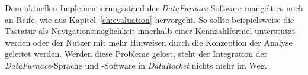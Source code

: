 \documentclass[
  language=german, %
  type=bachelor,%
  ngerman
]{isthesis}
\begin{document}
\begin{content}
Dem aktuellen Implementierungsstand der \textit{DataFurnace}-Software mangelt
es noch an Reife, wie aus Kapitel~\ref{ch:evaluation} hervorgeht. So sollte
beispielsweise die Tastatur als Navigationsmöglichkeit innerhalb einer
Kennzahlformel unterstützt werden oder der Nutzer mit mehr Hinweisen durch die
Konzeption der Analyse geleitet werden. Werden diese Probleme gelöst, steht der
Integration der \textit{DataFurnace}-Sprache und -Software in
\textit{DataRocket} nichts mehr im Weg.
  

\end{content}



%  







\end{document}
